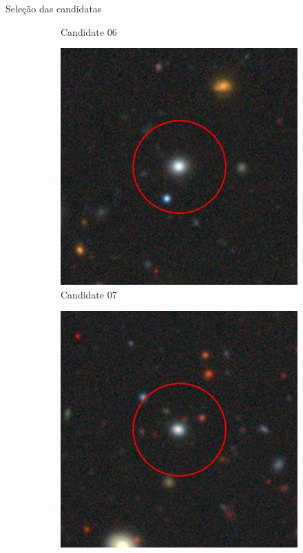 \begin{frame}[c]{Seleção das candidatas}
\begin{figure}[]
\begin{subfigure}[b]{0.13\textwidth}
            \caption{Candidate 06}
        \end{subfigure}
        \begin{subfigure}[b]{0.13\textwidth}
            \includegraphics[width=\textwidth]{images/candidata_final/07.jpg}
            \caption{Candidate 07}
        \end{subfigure}
        \begin{subfigure}[b]{0.13\textwidth}
            \includegraphics[width=\textwidth]{images/candidata_final/08.jpg}

\end{subfigure}
\end{figure}
\end{frame}
